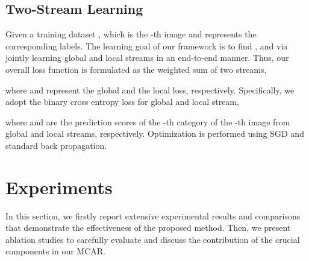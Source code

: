 \documentclass[journal]{IEEEtran}
\begin{document}
\subsection{Two-Stream Learning}
Given a training dataset , which  is the -th image and  represents the corresponding labels. The learning goal of our framework
is to find ,  and  via jointly learning global and local streams in an end-to-end manner. Thus, our overall loss function is formulated as the weighted sum of two streams,
 
 where  and  represent the global and the local loss, respectively. Specifically, we adopt the binary cross entropy loss for global and local stream,
  
 where  and  are the prediction scores of the -th category of the -th image from global and local streams, respectively. Optimization is performed using SGD and standard back propagation.
 

\section{Experiments}\label{exps}
In this section, we firstly report extensive experimental results and comparisons that demonstrate the effectiveness of the proposed method. Then, we present ablation studies to carefully evaluate and discuss the contribution of the crucial components in our MCAR. 
\end{document}
